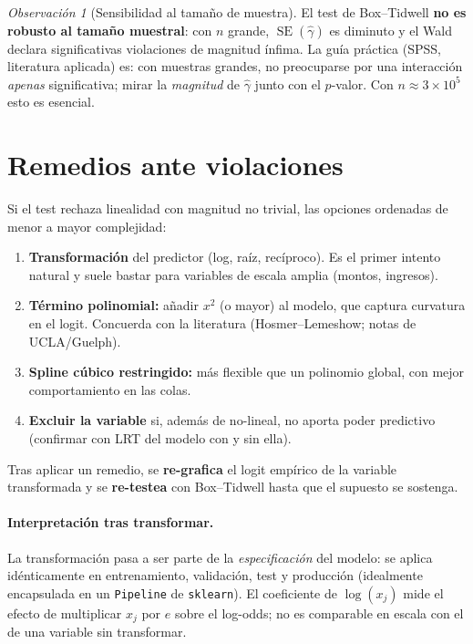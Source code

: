 \documentclass[11pt]{article}
\theoremstyle{plain}
\theoremstyle{definition}
\theoremstyle{remark}
\newtheorem{observacion}[teorema]{Observación}
\begin{document}
\begin{observacion}[Sensibilidad al tamaño de muestra]
El test de Box--Tidwell \textbf{no es robusto al tamaño muestral}: con $n$
grande, $\operatorname{SE}(\hat\gamma)$ es diminuto y el Wald declara
significativas violaciones de magnitud ínfima. La guía práctica (SPSS,
literatura aplicada) es: con muestras grandes, no preocuparse por una
interacción \emph{apenas} significativa; mirar la \emph{magnitud} de
$\hat\gamma$ junto con el $p$-valor. Con $n\approx 3\times10^5$ esto es esencial.
\end{observacion}

\section{Remedios ante violaciones}\label{sec:remedios}

Si el test rechaza linealidad con magnitud no trivial, las opciones ordenadas
de menor a mayor complejidad:

\begin{enumerate}[label=\textbf{\alph*.}]
  \item \textbf{Transformación} del predictor (log, raíz, recíproco). Es el
        primer intento natural y suele bastar para variables de escala amplia
        (montos, ingresos).
  \item \textbf{Término polinomial:} añadir $x^2$ (o mayor) al modelo, que
        captura curvatura en el logit. Concuerda con la literatura
        (Hosmer--Lemeshow; notas de UCLA/Guelph).
  \item \textbf{Spline cúbico restringido:} más flexible que un polinomio
        global, con mejor comportamiento en las colas.
  \item \textbf{Excluir la variable} si, además de no-lineal, no aporta poder
        predictivo (confirmar con LRT del modelo con y sin ella).
\end{enumerate}

Tras aplicar un remedio, se \textbf{re-grafica} el logit empírico de la variable
transformada y se \textbf{re-testea} con Box--Tidwell hasta que el supuesto se
sostenga.

\paragraph{Interpretación tras transformar.} La transformación pasa a ser parte
de la \emph{especificación} del modelo: se aplica idénticamente en
entrenamiento, validación, test y producción (idealmente encapsulada en un
\texttt{Pipeline} de \texttt{sklearn}). El coeficiente de $\log(x_j)$ mide el
efecto de multiplicar $x_j$ por $e$ sobre el log-odds; no es comparable en
escala con el de una variable sin transformar.
\end{document}
